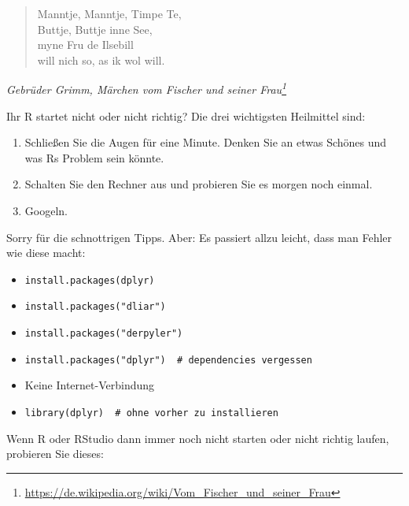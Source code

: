 \documentclass[12pt,]{book}
\providecommand{\tightlist}{%
  \setlength{\itemsep}{0pt}\setlength{\parskip}{0pt}}
\let\rmarkdownfootnote\footnote%
\def\footnote{\protect\rmarkdownfootnote}
\begin{document}
\begin{quote}
Manntje, Manntje, Timpe Te,\\
Buttje, Buttje inne See,\\
myne Fru de Ilsebill\\
will nich so, as ik wol will.
\end{quote}

\emph{Gebrüder Grimm, Märchen vom Fischer und seiner Frau\footnote{\url{https://de.wikipedia.org/wiki/Vom_Fischer_und_seiner_Frau}}}

Ihr R startet nicht oder nicht richtig? Die drei wichtigsten Heilmittel
sind:

\begin{enumerate}
\def\labelenumi{\arabic{enumi}.}
\tightlist
\item
  Schließen Sie die Augen für eine Minute. Denken Sie an etwas Schönes
  und was Rs Problem sein könnte.
\item
  Schalten Sie den Rechner aus und probieren Sie es morgen noch einmal.
\item
  Googeln.
\end{enumerate}

Sorry für die schnottrigen Tipps. Aber: Es passiert allzu leicht, dass
man Fehler wie diese macht:

\begin{itemize}
\tightlist
\item
  \texttt{install.packages(dplyr)}
\item
  \texttt{install.packages("dliar")}
\item
  \texttt{install.packages("derpyler")}
\item
  \texttt{install.packages("dplyr")\ \ \#\ dependencies\ vergessen}
\item
  Keine Internet-Verbindung
\item
  \texttt{library(dplyr)\ \ \#\ ohne\ vorher\ zu\ installieren}
\end{itemize}

Wenn R oder RStudio dann immer noch nicht starten oder nicht richtig
laufen, probieren Sie dieses:
\end{document}
